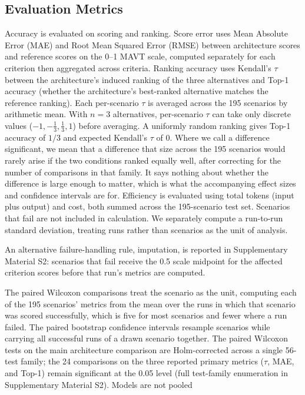 \documentclass[final,3p,times]{elsarticle}
\begin{document}
\subsection{Evaluation Metrics}
\label{sec:eval-metrics}
Accuracy is evaluated on scoring and ranking. Score error uses Mean Absolute Error (MAE) and Root Mean Squared Error (RMSE) between architecture scores and reference scores on the 0--1 MAVT scale, computed separately for each criterion then aggregated across criteria. Ranking accuracy uses Kendall's $\tau$ between the architecture's induced ranking of the three alternatives and Top-1 accuracy (whether the architecture's best-ranked alternative matches the reference ranking). Each per-scenario $\tau$ is averaged across the 195 scenarios by arithmetic mean. With $n=3$ alternatives, per-scenario $\tau$ can take only discrete values ($-1, -\frac{1}{3}, \frac{1}{3}, 1$) before averaging. A uniformly random ranking gives Top-1 accuracy of $1/3$ and expected Kendall's $\tau$ of $0$. Where we call a difference significant, we mean that a difference that size across the 195 scenarios would rarely arise if the two conditions ranked equally well, after correcting for the number of comparisons in that family. It says nothing about whether the difference is large enough to matter, which is what the accompanying effect sizes and confidence intervals are for. Efficiency is evaluated using total tokens (input plus output) and cost, both summed across the 195-scenario test set. Scenarios that fail are not included in calculation. We separately compute a run-to-run standard deviation, treating runs rather than scenarios as the unit of analysis.

An alternative failure-handling rule, imputation, is reported in Supplementary Material S2: scenarios that fail receive the 0.5 scale midpoint for the affected criterion scores before that run's metrics are computed.

The paired Wilcoxon comparisons treat the scenario as the unit, computing each of the 195 scenarios' metrics from the mean over the runs in which that scenario was scored successfully, which is five for most scenarios and fewer where a run failed. The paired bootstrap confidence intervals resample scenarios while carrying all successful runs of a drawn scenario together. The paired Wilcoxon tests on the main architecture comparison are Holm-corrected across a single 56-test family; the 24 comparisons on the three reported primary metrics ($\tau$, MAE, and Top-1) remain significant at the 0.05 level (full test-family enumeration in Supplementary Material S2). Models are not pooled
\end{document}
